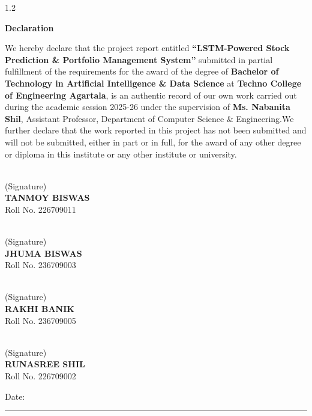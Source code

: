\documentclass[12pt, a4paper]{report}
\begin{document}
\cfoot{\thepage}
\begin{spacing}{1.2}

\newpage
\thispagestyle{plain} %
\baselineskip \centerline{\LARGE{\bf Declaration}} \baselineskip
\noindent
We hereby declare that the project report entitled \textbf{``LSTM-Powered Stock Prediction \& Portfolio Management System''} submitted in partial fulfillment of the requirements for the award of the degree of \textbf{Bachelor of Technology in Artificial Intelligence \& Data Science} at \textbf{Techno College of Engineering Agartala}, is an authentic record of our own work carried out during the academic session 2025-26 under the supervision of \textbf{Ms. Nabanita Shil}, Assistant Professor, Department of Computer Science \& Engineering.We further declare that the work reported in this project has not been submitted and will not be submitted, either in part or in full, for the award of any other degree or diploma in this institute or any other institute or university.

\vspace{2cm}
\begin{center}
\vspace{1cm}
\begin{minipage}{0.4\textwidth}
    \hrulefill\\ (Signature)\\ \textbf{TANMOY BISWAS} \\ Roll No. 226709011\\
\end{minipage}
\hfill
\begin{minipage}{0.4\textwidth}
    \hrulefill\\ (Signature)\\ \textbf{JHUMA BISWAS} \\ Roll No. 236709003\\
\end{minipage}
\vspace{1.5cm}

\begin{minipage}{0.4\textwidth}
    \hrulefill\\ (Signature)\\ \textbf{RAKHI BANIK} \\ Roll No. 236709005\\
\end{minipage}
\hfill
\begin{minipage}{0.4\textwidth}
    \hrulefill\\ (Signature)\\ \textbf{RUNASREE SHIL} \\ Roll No. 226709002\\
\end{minipage}
\end{center}
\vspace{1cm}
\noindent Date: \rule{4.5cm}{0.4pt}


\end{spacing}
\end{document}
